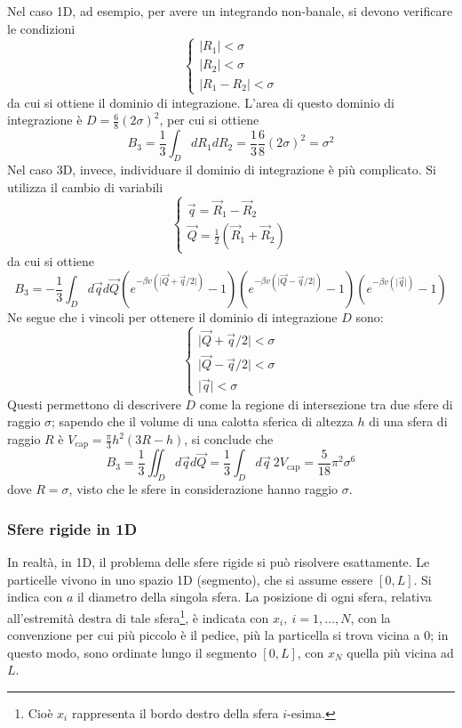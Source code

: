 \documentclass[11pt, a4paper]{scrartcl}
\theoremstyle{style}
\theoremstyle{style1}
\numberwithin{equation}{subsection}
\begin{document}
Nel caso 1D, ad esempio, per avere un integrando non-banale, si devono verificare le condizioni
\[
\begin{cases}
	\lvert R_1 \rvert <\sigma \\
	\lvert R_2 \rvert < \sigma \\
	\lvert R_1-R_2 \rvert < \sigma 
\end{cases}
\] 
da cui si ottiene il dominio di integrazione.
L'area di questo dominio di integrazione \`e $D = \frac{6}{8}(2\sigma )^2$, per cui si ottiene 
\[
B_3 = \frac{1}{3}\int_{D} dR_1dR_2 = \frac{1}{3}\frac{6 }{8}(2\sigma )^2 = \sigma ^2
\] 
Nel caso 3D, invece, individuare il dominio di integrazione \`e pi\`u complicato. 
Si utilizza il cambio di variabili 
\[
\begin{cases}
	\vec{q} = \vec{R}_1 - \vec{R}_2 \\
	\vec{Q} = \frac{1}{2} \left(\vec{R}_1 + \vec{R}_2\right) 
\end{cases}
\] 
da cui si ottiene
\[
B_3 = -\frac{1}{3} \int_{D} d\vec{q}d\vec{Q} \left(e^{-\beta v\left(\lvert \vec{Q}+ \vec{q}/2 \rvert\right) }-1\right) \left(e^{-\beta v\left(\lvert \vec{Q} - \vec{q}/2 \rvert\right) }-1\right)\left(e^{-\beta v\left(\lvert \vec{q} \rvert\right) }-1\right)
\] 
Ne segue che i vincoli per ottenere il dominio di integrazione $D$ sono:
\[
\begin{cases}
	\lvert \vec{Q}+ \vec{q}/2 \rvert <\sigma \\
	\lvert \vec{Q} - \vec{q}/2 \rvert <\sigma \\
	\lvert \vec{q} \rvert <\sigma 
\end{cases}
\] 
Questi permettono di descrivere $D$ come la regione di intersezione tra due sfere di raggio $\sigma $; sapendo che il volume di una calotta sferica di altezza $h$ di una sfera di raggio $R$ \`e $V_{\text{cap}} = \frac{\pi}{3}h^2 (3R-h)$, si conclude che
\[
B_3 = \frac{1}{3} \iint_{D} d\vec{q} d\vec{Q} = \frac{1}{3}\int_{D} d\vec{q}\ 2V_\text{cap} = \frac{5}{18}\pi^2 \sigma ^6
\] 
dove $R=\sigma $, visto che le sfere in considerazione hanno raggio $\sigma $.

\subsubsection{Sfere rigide in 1D}
In realt\`a, in 1D, il problema delle sfere rigide si pu\`o risolvere esattamente. 
Le particelle vivono in uno spazio 1D (segmento), che si assume essere $[0,L]$.
Si indica con $a$ il diametro della singola sfera.
La posizione di ogni sfera, relativa all'estremit\`a destra di tale sfera\footnote{Cio\`e $x_i$ rappresenta il bordo destro della sfera $i$-esima.}, \`e indicata con $x_i, \ i=1,\ldots,N$, con la convenzione per cui pi\`u piccolo \`e il pedice, pi\`u la particella si trova vicina a $0$; in questo modo, sono ordinate lungo il segmento $[0,L]$, con $x_N$ quella pi\`u vicina ad $L$.
\end{document}
